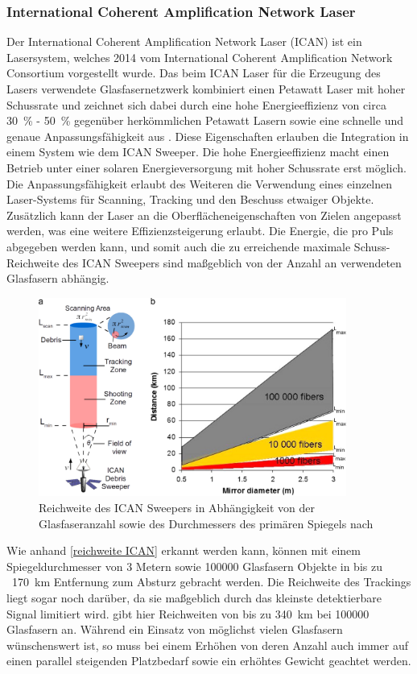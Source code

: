 \documentclass{article}
\begin{document}
\subsubsection{International Coherent Amplification Network Laser}
Der International Coherent Amplification Network Laser (ICAN) ist ein Lasersystem, welches 2014 vom International Coherent Amplification Network Consortium vorgestellt wurde. Das beim ICAN Laser für die Erzeugung des Lasers verwendete Glasfasernetzwerk kombiniert einen Petawatt Laser mit hoher Schussrate und zeichnet sich dabei durch eine hohe Energieeffizienz von circa \SI{30}{\percent} - \SI{50}{\percent} gegenüber herkömmlichen Petawatt Lasern sowie eine schnelle und genaue Anpassungsfähigkeit aus \citet{icanlaser}. Diese Eigenschaften erlauben die Integration in einem System wie dem ICAN Sweeper. Die hohe Energieeffizienz macht einen Betrieb unter einer solaren Energieversorgung mit hoher Schussrate erst möglich. Die Anpassungsfähigkeit erlaubt des Weiteren die Verwendung eines einzelnen Laser-Systems für Scanning, Tracking und den Beschuss etwaiger Objekte. Zusätzlich kann der Laser an die Oberflächeneigenschaften von Zielen angepasst werden, was eine weitere Effizienzsteigerung erlaubt. Die Energie, die pro Puls abgegeben werden kann, und somit auch die zu erreichende maximale Schuss-Reichweite des ICAN Sweepers sind maßgeblich von der Anzahl an verwendeten Glasfasern abhängig.
\begin{figure}[H]
	\centering
	\includegraphics[width = 0.9\textwidth]{images/ICAN_reichwite.jpg}
	\caption{Reichweite des ICAN Sweepers in Abhängigkeit von der Glasfaseranzahl sowie des Durchmessers des primären Spiegels nach \citet{soulard2014ican}}
	\label{reichweite ICAN}
\end{figure}
\noindent
Wie anhand \autoref{reichweite ICAN} erkannt werden kann, können mit einem Spiegeldurchmesser von 3 Metern sowie 100000 Glasfasern Objekte in bis zu ~\SI{170}{\kilo\meter} Entfernung zum Absturz gebracht werden. Die Reichweite des Trackings liegt sogar noch darüber, da sie maßgeblich durch das kleinste detektierbare Signal limitiert wird. \citet{soulard2014ican} gibt hier Reichweiten von bis zu \SI{340}{\kilo\meter} bei 100000 Glasfasern an. Während ein Einsatz von möglichst vielen Glasfasern wünschenswert ist, so muss bei einem Erhöhen von deren Anzahl auch immer auf einen parallel steigenden Platzbedarf sowie ein erhöhtes Gewicht geachtet werden.
\end{document}
